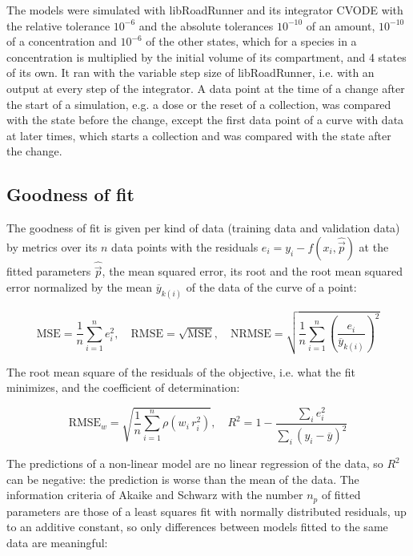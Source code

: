 The models were simulated with libRoadRunner \cite{Welsh2023} and its integrator CVODE \cite{Hindmarsh2005} with the relative tolerance $10^{-6}$ and the absolute tolerances $10^{-10}$ of an amount, $10^{-10}$ of a concentration and $10^{-6}$ of the other states, which for a species in a concentration is multiplied by the initial volume of its compartment, and 4 states of its own. It ran with the variable step size of libRoadRunner, i.e. with an output at every step of the integrator. A data point at the time of a change after the start of a simulation, e.g. a dose or the reset of a collection, was compared with the state before the change, except the first data point of a curve with data at later times, which starts a collection and was compared with the state after the change.

\subsection{Goodness of fit}

The goodness of fit is given per kind of data (training data and validation data) by metrics over its $n$ data points with the residuals $e_i = y_i - f(x_i, \hat{\vec{p}})$ at the fitted parameters $\hat{\vec{p}}$, the mean squared error, its root and the root mean squared error normalized by the mean $\overline{y}_{k(i)}$ of the data of the curve of a point:

\begin{equation}
\mathrm{MSE} = \frac{1}{n} \sum_{i=1}^{n} e_i^2, \quad \mathrm{RMSE} = \sqrt{\mathrm{MSE}}, \quad \mathrm{NRMSE} = \sqrt{\frac{1}{n} \sum_{i=1}^{n} \left(\frac{e_i}{\overline{y}_{k(i)}}\right)^2}
\end{equation}

The root mean square of the residuals of the objective, i.e. what the fit minimizes, and the coefficient of determination:

\begin{equation}
\mathrm{RMSE}_w = \sqrt{\frac{1}{n} \sum_{i=1}^{n} \rho\left(w_i\, r_i^2\right)}, \quad R^2 = 1 - \frac{\sum_{i} e_i^2}{\sum_{i} \left(y_i - \overline{y}\right)^2}
\end{equation}

The predictions of a non-linear model are no linear regression of the data, so $R^2$ can be negative: the prediction is worse than the mean of the data. The information criteria of Akaike \cite{Akaike1974} and Schwarz \cite{Schwarz1978} with the number $n_p$ of fitted parameters are those of a least squares fit with normally distributed residuals, up to an additive constant, so only differences between models fitted to the same data are meaningful:

